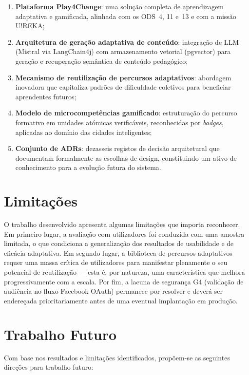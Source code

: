 \begin{enumerate}
  \item \textbf{Plataforma Play4Change}: uma solução completa de aprendizagem adaptativa e gamificada, alinhada com os ODS~4, 11 e~13 e com a missão U!REKA;
  \item \textbf{Arquitetura de geração adaptativa de conteúdo}: integração de LLM (Mistral via LangChain4j) com armazenamento vetorial (pgvector) para geração e recuperação semântica de conteúdo pedagógico;
  \item \textbf{Mecanismo de reutilização de percursos adaptativos}: abordagem inovadora que capitaliza padrões de dificuldade coletivos para beneficiar aprendentes futuros;
  \item \textbf{Modelo de microcompetências gamificado}: estruturação do percurso formativo em unidades atómicas verificáveis, reconhecidas por \textit{badges}, aplicadas ao domínio das cidades inteligentes;
  \item \textbf{Conjunto de ADRs}: dezasseis registos de decisão arquitetural que documentam formalmente as escolhas de design, constituindo um ativo de conhecimento para a evolução futura do sistema.
\end{enumerate}

\section{Limitações}
\label{sec:limitacoes}

O trabalho desenvolvido apresenta algumas limitações que importa reconhecer. Em primeiro lugar, a avaliação com utilizadores foi conduzida com uma amostra limitada, o que condiciona a generalização dos resultados de usabilidade e de eficácia adaptativa. Em segundo lugar, a biblioteca de percursos adaptativos requer uma massa crítica de utilizadores para manifestar plenamente o seu potencial de reutilização --- esta é, por natureza, uma característica que melhora progressivamente com a escala. Por fim, a lacuna de segurança G4 (validação de audiência no fluxo Facebook OAuth) permanece por resolver e deverá ser endereçada prioritariamente antes de uma eventual implantação em produção.

\section{Trabalho Futuro}
\label{sec:trabalho_futuro}

Com base nos resultados e limitações identificados, propõem-se as seguintes direções para trabalho futuro:

